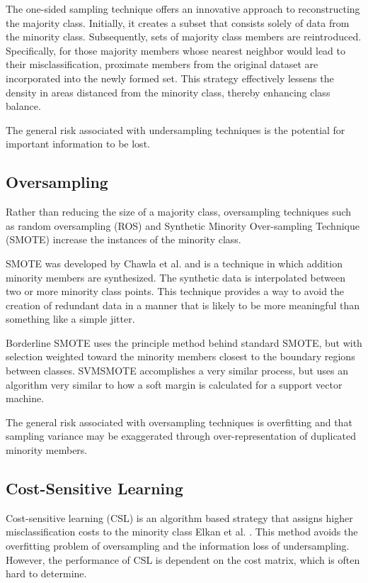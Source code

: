 \documentclass[journal]{IEEEtran}
\begin{document}
	The one-sided sampling technique \cite{kubat1997} offers an innovative approach to reconstructing the majority class. Initially, it creates a subset that consists solely of data from the minority class. Subsequently, sets of majority class members are reintroduced. Specifically, for those majority members whose nearest neighbor would lead to their misclassification, proximate members from the original dataset are incorporated into the newly formed set. This strategy effectively lessens the density in areas distanced from the minority class, thereby enhancing class balance.

	The general risk associated with undersampling techniques is the potential for important information to be lost.

	\subsection{Oversampling}

	Rather than reducing the size of a majority class, oversampling techniques such as random oversampling (ROS) and Synthetic Minority Over-sampling Technique (SMOTE) increase the instances of the minority class. 

	SMOTE was developed by Chawla et al. \cite{chawla2002} and is a technique in which addition minority members are synthesized. The synthetic data is interpolated between two or more minority class points. This technique provides a way to avoid the creation of redundant data in a manner that is likely to be more meaningful than something like a simple jitter. 

	Borderline SMOTE \cite{han2005} uses the principle method behind standard SMOTE, but with selection weighted toward the minority members closest to the boundary regions between classes. SVMSMOTE \cite{nguyen2011} accomplishes a very similar process, but uses an algorithm very similar to how a soft margin is calculated for a support vector machine.

	The general risk associated with oversampling techniques is overfitting and that sampling variance may be exaggerated through over-representation of duplicated minority members.

	\subsection{Cost-Sensitive Learning}
	
	Cost-sensitive learning (CSL) is an algorithm based strategy that assigns higher misclassification costs to the minority class Elkan et al. \cite{elkan2001}. This method avoids the overfitting problem of oversampling and the information loss of undersampling. However, the performance of CSL is dependent on the cost matrix, which is often hard to determine.
	
\end{document}
